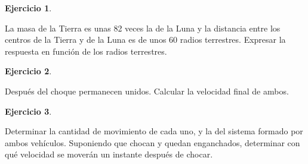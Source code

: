 \documentclass[a4paper,12pt,twoside]{book}
\newtheorem{ejercicio}{{Ejercicio}}[chapter]
\begin{document}
\begin{mdframed}[style=ejercicio-facil]
    \begin{ejercicio}
    \end{ejercicio}
    La masa de la Tierra es unas 82 veces la de la Luna y la distancia entre los centros de la Tierra y de la Luna es de unos 60 radios terrestres.
    Expresar la respuesta en función de los radios terrestres.
\end{mdframed}

\begin{mdframed}[style=ejercicio-facil]
    \begin{ejercicio}
    \end{ejercicio}
    Después del choque permanecen unidos. Calcular la velocidad final de ambos.
    \begin{center}
        \def\svgwidth{0.5\linewidth}
        
    \end{center}
\end{mdframed}

\begin{mdframed}[style=ejercicio-facil]
    \begin{ejercicio}
    \end{ejercicio}
    Determinar la cantidad de movimiento de cada uno, y la del sistema formado por ambos vehículos.
    Suponiendo que chocan y quedan enganchados, determinar con qué velocidad se moverán un instante después de chocar.
\end{mdframed}
\end{document}
